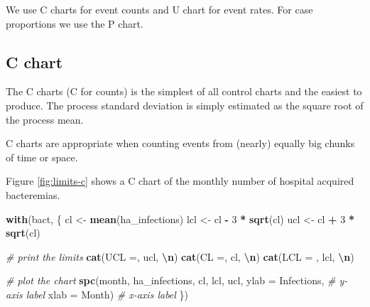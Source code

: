 \documentclass[
]{book}
\newenvironment{Shaded}{\begin{snugshade}}{\end{snugshade}}
\newcommand{\AttributeTok}[1]{\textcolor[rgb]{0.13,0.29,0.53}{#1}}
\newcommand{\CommentTok}[1]{\textcolor[rgb]{0.56,0.35,0.01}{\textit{#1}}}
\newcommand{\DecValTok}[1]{\textcolor[rgb]{0.00,0.00,0.81}{#1}}
\newcommand{\FunctionTok}[1]{\textcolor[rgb]{0.13,0.29,0.53}{\textbf{#1}}}
\newcommand{\NormalTok}[1]{#1}
\newcommand{\OtherTok}[1]{\textcolor[rgb]{0.56,0.35,0.01}{#1}}
\newcommand{\SpecialCharTok}[1]{\textcolor[rgb]{0.81,0.36,0.00}{\textbf{#1}}}
\newcommand{\StringTok}[1]{\textcolor[rgb]{0.31,0.60,0.02}{#1}}
\begin{document}
We use C charts for event counts and U chart for event rates. For case proportions we use the P chart.

\subsection{C chart}\label{c-chart}

The C charts (C for counts) is the simplest of all control charts and the easiest to produce. The process standard deviation is simply estimated as the square root of the process mean.

C charts are appropriate when counting events from (nearly) equally big chunks of time or space.

Figure \ref{fig:limits-c} shows a C chart of the monthly number of hospital acquired bacteremias.

\begin{Shaded}
\begin{Highlighting}[]
\FunctionTok{with}\NormalTok{(bact, \{}
\NormalTok{  cl  }\OtherTok{\textless{}{-}} \FunctionTok{mean}\NormalTok{(ha\_infections)}
\NormalTok{  lcl }\OtherTok{\textless{}{-}}\NormalTok{ cl }\SpecialCharTok{{-}} \DecValTok{3} \SpecialCharTok{*} \FunctionTok{sqrt}\NormalTok{(cl)}
\NormalTok{  ucl }\OtherTok{\textless{}{-}}\NormalTok{ cl }\SpecialCharTok{+} \DecValTok{3} \SpecialCharTok{*} \FunctionTok{sqrt}\NormalTok{(cl)}
  
  \CommentTok{\# print the limits}
  \FunctionTok{cat}\NormalTok{(}\StringTok{\textquotesingle{}UCL =\textquotesingle{}}\NormalTok{,  ucl, }\StringTok{\textquotesingle{}}\SpecialCharTok{\textbackslash{}n}\StringTok{\textquotesingle{}}\NormalTok{)}
  \FunctionTok{cat}\NormalTok{(}\StringTok{\textquotesingle{}CL  =\textquotesingle{}}\NormalTok{,   cl, }\StringTok{\textquotesingle{}}\SpecialCharTok{\textbackslash{}n}\StringTok{\textquotesingle{}}\NormalTok{)}
  \FunctionTok{cat}\NormalTok{(}\StringTok{\textquotesingle{}LCL = \textquotesingle{}}\NormalTok{, lcl, }\StringTok{\textquotesingle{}}\SpecialCharTok{\textbackslash{}n}\StringTok{\textquotesingle{}}\NormalTok{)}
  
  \CommentTok{\# plot the chart}
  \FunctionTok{spc}\NormalTok{(month, ha\_infections,}
\NormalTok{      cl, lcl, ucl,}
      \AttributeTok{ylab =} \StringTok{\textquotesingle{}Infections\textquotesingle{}}\NormalTok{, }\CommentTok{\# y{-}axis label}
      \AttributeTok{xlab =} \StringTok{\textquotesingle{}Month\textquotesingle{}}\NormalTok{)      }\CommentTok{\# x{-}axis label}
\NormalTok{\})}
\end{Highlighting}
\end{Shaded}
\end{document}
